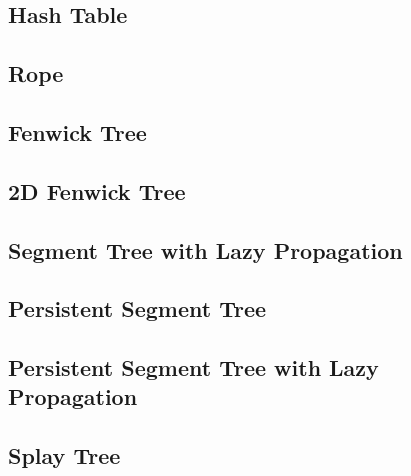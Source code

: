 \documentclass[9pt,landscape,a4paper,twocolumn]{extarticle}
\begin{document}
\subsection{Hash Table}


\subsection{Rope}


\subsection{Fenwick Tree}


\subsection{2D Fenwick Tree}


\subsection{Segment Tree with Lazy Propagation}


% 

\subsection{Persistent Segment Tree}


\subsection{Persistent Segment Tree with Lazy Propagation}


\subsection{Splay Tree}

\end{document}
